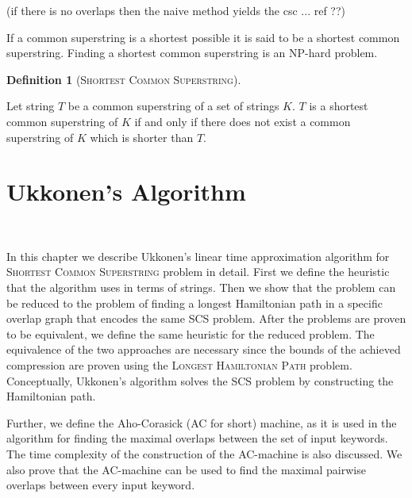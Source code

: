 \documentclass[english,twoside,censored,csm,algorithms-track-2020]{HYthesisML}
\theoremstyle{plain}
\theoremstyle{definition}
\newtheorem{definition}[theorem]{Definition}
\begin{document}
(if there is no overlaps then the naive method yields the csc ... ref ??)

If a common superstring is a shortest possible it is said to be a shortest common superstring. Finding a shortest common superstring is
an \textsc{NP}-hard problem. 

\begin{definition}[\textsc{Shortest Common Superstring}]~\label{def-scs}

  Let string $T$ be a common superstring of a set of strings $K$.
  $T$ is a shortest common superstring of $K$ if and only if there does not exist a common superstring of $K$ which is shorter than $T$.
  
\end{definition}







\chapter{Ukkonen's Algorithm}~\label{chp-ukkonen}

In this chapter we describe Ukkonen's linear time approximation algorithm \citep{Ukkonen90} for
\textsc{Shortest Common Superstring} problem in detail. First we define the heuristic that the
algorithm uses in terms of strings. Then we show that the problem can be reduced to the problem
of finding a longest Hamiltonian path in a specific overlap graph that encodes the same SCS problem.
After the problems are proven to be equivalent, we define the same heuristic for the reduced problem.
The equivalence of the two approaches are necessary since the bounds of the achieved compression
are proven using the \textsc{Longest Hamiltonian Path} problem. Conceptually, Ukkonen's algorithm 
solves the SCS problem by constructing the Hamiltonian path.

Further, we define the Aho-Corasick (AC for short) machine, as it is used in the algorithm for finding
the maximal overlaps between the set of input keywords. The time complexity of the construction of
the AC-machine is also discussed. We also prove that the AC-machine can be used to find the maximal
pairwise overlaps between every input keyword.
\end{document}
